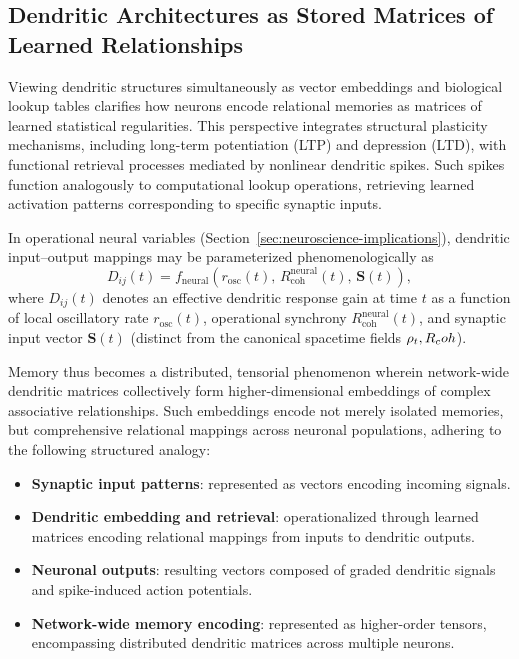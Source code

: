 \subsection{Dendritic Architectures as Stored Matrices of Learned Relationships}

Viewing dendritic structures simultaneously as vector embeddings and biological lookup tables clarifies how neurons encode relational memories as matrices of learned statistical regularities. This perspective integrates structural plasticity mechanisms, including long-term potentiation (LTP) and depression (LTD), with functional retrieval processes mediated by nonlinear dendritic spikes. Such spikes function analogously to computational lookup operations, retrieving learned activation patterns corresponding to specific synaptic inputs.

In operational neural variables (Section~\ref{sec:neuroscience-implications}), dendritic input--output mappings may be parameterized phenomenologically as
\begin{equation}
    D_{ij}(t) = f_{\mathrm{neural}}\!\left(r_{\mathrm{osc}}(t),\, R_{\mathrm{coh}}^{\mathrm{neural}}(t),\, \mathbf{S}(t)\right),
\end{equation}
where $D_{ij}(t)$ denotes an effective dendritic response gain at time $t$ as a function of local oscillatory rate $r_{\mathrm{osc}}(t)$, operational synchrony $R_{\mathrm{coh}}^{\mathrm{neural}}(t)$, and synaptic input vector $\mathbf{S}(t)$ (distinct from the canonical spacetime fields $\rho_t, R_coh$).

Memory thus becomes a distributed, tensorial phenomenon wherein network-wide dendritic matrices collectively form higher-dimensional embeddings of complex associative relationships. Such embeddings encode not merely isolated memories, but comprehensive relational mappings across neuronal populations, adhering to the following structured analogy:

\begin{itemize}
    \item \textbf{Synaptic input patterns}: represented as vectors encoding incoming signals.
    \item \textbf{Dendritic embedding and retrieval}: operationalized through learned matrices encoding relational mappings from inputs to dendritic outputs.
    \item \textbf{Neuronal outputs}: resulting vectors composed of graded dendritic signals and spike-induced action potentials.
    \item \textbf{Network-wide memory encoding}: represented as higher-order tensors, encompassing distributed dendritic matrices across multiple neurons.
\end{itemize}


